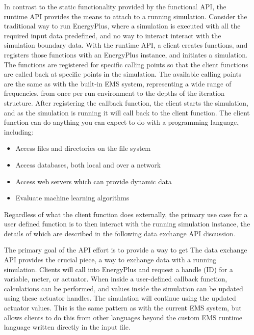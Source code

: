 \documentclass[5p, authoryear]{elsarticle}
\begin{document}
In contrast to the static functionality provided by the functional API, the runtime API provides the means to attach to a running simulation.
Consider the traditional way to run EnergyPlus, where a simulation is executed with all the required input data predefined, and no way to interact interact with the simulation boundary data.
With the runtime API, a client creates functions, and registers those functions with an EnergyPlus instance, and initiates a simulation.
The functions are registered for specific calling points so that the client functions are called back at specific points in the simulation.
The available calling points are the same as with the built-in EMS system, representing a wide range of frequencies, from once per run environment to the depths of the iteration structure.
After registering the callback function, the client starts the simulation, and as the simulation is running it will call back to the client function.
The client function can do anything you can expect to do with a programming language, including:
\begin{itemize}
 \item Access files and directories on the file system
 \item Access databases, both local and over a network
 \item Access web servers which can provide dynamic data
 \item Evaluate machine learning algorithms
\end{itemize}
Regardless of what the client function does externally, the primary use case for a user defined function is to then interact with the running simulation instance, the details of which are described in the following data exchange API discussion.

The primary goal of the API effort is to provide a way to get 
The data exchange API provides the crucial piece, a way to exchange data with a running simulation.  Clients will call into EnergyPlus and request a handle (ID) for a variable, meter, or actuator.  When inside a user-defined callback function, calculations can be performed, and values inside the simulation can be updated using these actuator handles.  The simulation will continue using the updated actuator values.  This is the same pattern as with the current EMS system, but allows clients to do this from other languages beyond the custom EMS runtime language written directly in the input file.
\end{document}
